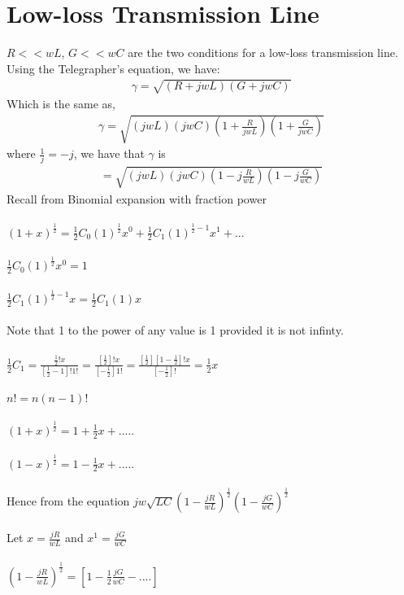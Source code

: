 \section{Low-loss Transmission Line}
$R << wL$, $G << wC$ are the two conditions for a low-loss transmission line. Using the Telegrapher's equation, we have:
\begin{align*}
\gamma = \sqrt{(R + jwL)(G + jwC)}
\end{align*}
Which is the same as,
\begin{align*}
\gamma = \sqrt{{(jwL)(jwC)(1 + \frac{R}{jwL})(1 + \frac{G}{jwC})}}
\end{align*}
where $\frac{1}{j} = -j$, we have that $\gamma$ is
\begin{align*}
= \sqrt{{(jwL)(jwC)(1 - j\frac{R}{wL})(1 - j\frac{G}{wC})}}
\end{align*}
Recall from Binomial expansion with fraction power\\\\
$(1 + x)^{\frac{1}{2}} = \frac{1}{2}C_0(1)^{\frac{1}{2}}x^0 + \frac{1}{2}C_1(1)^{{\frac{1}{2}} - 1}x^1 + ...$\\\\
$\frac{1}{2}C_0(1)^{\frac{1}{2}}x^0 = 1$\\\\
$\frac{1}{2}C_1(1)^{\frac{1}{2} - 1}x = \frac{1}{2}C_1(1)x$\\\\
Note that 1 to the power of any value is 1 provided it is not infinty.\\\\
$\frac{1}{2}C_1 = \frac{\frac{1}{2}! x}{[\frac{1}{2} - 1]! 1!} = \frac{[\frac{1}{2}]!x}{[-\frac{1}{2}]1!} = \frac{[\frac{1}{2}][1 - \frac{1}{2}]!x}{[-\frac{1}{2}]!} = \frac{1}{2}x$\\\\
$n! = n(n - 1)!$\\\\
$(1 + x)^{\frac{1}{2}} = 1 + \frac{1}{2}x + .....$\\\\
$(1 - x)^{\frac{1}{2}} = 1 - \frac{1}{2}x + .....$\\\\
Hence from the equation
$jw\sqrt{LC}(1 - \frac{jR}{wL})^{\frac{1}{2}}(1 - \frac{jG}{wC})^{\frac{1}{2}}$\\\\
Let $x = \frac{jR}{wL}$ and $x^1 = \frac{jG}{wC}$\\\\
$(1 - \frac{jR}{wL})^{\frac{1}{2}} =[1 - \frac{1}{2}\frac{jG}{wC} - ....]$\\\\
